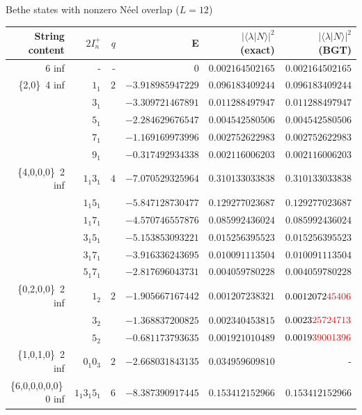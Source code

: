 \documentclass[11pt]{iopart}
\begin{document}
\begin{table}[h]
\scriptsize
\centering
Bethe states with nonzero N\'eel overlap ($L=12$)\\[1ex]
\begin{tabular}{rrrrrr}
\toprule
String content & $2I^+_n$ & $q$ & E & $|\langle\lambda|N\rangle|^2$ (exact) & $|\langle
\lambda|N\rangle|^2$ (BGT) \\[0.3em]
\toprule
6 inf & - & - & $0$ & $0.002164502165$ & $0.002164502165$\\
\midrule
\{2,0\}\, 4 inf &$1_1$ & $2$ & $-3.918985947229$ & $0.096183409244$ & $0.096183409244$\\
 &$3_1 $ & & $-3.309721467891$ & $0.011288497947$ &             $0.011288497947$\\
 &$5_1 $ & & $-2.284629676547$ & $0.004542580506$ &             $0.004542580506$\\
 &$7_1 $ & & $-1.169169973996$ & $0.002752622983$ &             $0.002752622983$\\
 &$9_1 $ & & $-0.317492934338$ & $0.002116006203$ &             $0.002116006203$\\
\midrule
\{4,0,0,0\}\, 2 inf &$1_1 3_1 $ & $4$ & $-7.070529325964$ & $0.310133033838$ &$0.310133033838$\\
  &$1_1 5_1 $ & & $-5.847128730477$ & $0.129277023687$ &           $0.129277023687$\\
  &$ 1_1 7_1$ & & $-4.570746557876$ & $0.085992436024$ &           $0.085992436024$\\
  &$ 3_1 5_1$ & & $-5.153853093221$ & $0.015256395523$ &           $0.015256395523$\\
  &$3_1 7_1 $ & & $-3.916336243695$ & $0.010091113504$ &           $0.010091113504$\\
  &$5_1 7_1 $ & & $-2.817696043731$ & $0.004059780228$ &           $0.004059780228$\\
\midrule
\{0,2,0,0\}\, 2 inf &$1_2 $ & $2$ & $-1.905667167442$ & $0.001207238321$ & $0.0012072{\color{red}45406}$\\
  &$3_2 $ & & $-1.368837200825$ & $0.002340453815$ &            $0.0023{\color{red}25724713}$\\
  &$5_2 $ & & $-0.681173793635$ & $0.001921010489$ &            $0.0019{\color{red}39001396}$\\
\midrule
\{1,0,1,0\}\, 2 inf &$0_1 0_3$ & $2$ & $-2.668031843135$ & $0.034959609810$ & -\\
\midrule
\{6,0,0,0,0,0\}\, 0 inf &$1_1 3_1 5_1$ & $6$ & $-8.387390917445$ & $0.153412152966$ & $0.153412152966$\\

\end{tabular}
\end{table}
\end{document}
